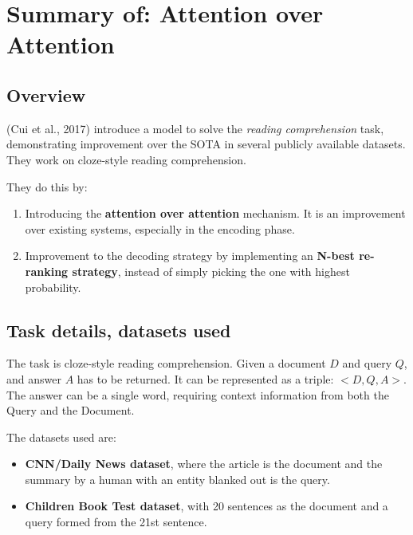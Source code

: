 \documentclass[a4 paper]{article}
\begin{document}

\section{Summary of: Attention over Attention}

\subsection{Overview}

(Cui et al., 2017) introduce a model to solve the \textit{reading comprehension}
task, demonstrating improvement over the SOTA in several publicly available
datasets. They work on cloze-style reading comprehension.

\vspace{1em}

They do this by:
\begin{enumerate}
    \item Introducing the \textbf{attention over attention} mechanism. It is an
        improvement over existing systems, especially in the encoding phase.
    \item Improvement to the decoding strategy by implementing an 
        \textbf{N-best re-ranking strategy}, instead of simply picking the
        one with highest probability.
\end{enumerate}

\subsection{Task details, datasets used}
The task is cloze-style reading comprehension. Given a document $D$ and query
$Q$, and answer $A$ has to be returned. It can be represented as a triple:
$<D, Q, A>$. The answer can be a single word, requiring context information
from both the Query and the Document.

\vspace{1em}

The datasets used are:

\begin{itemize}
    \item \textbf{CNN/Daily News dataset}, where the article is the document
        and the summary by a human with an entity blanked out is the query.
    \item \textbf{Children Book Test dataset}, with 20 sentences as the document
        and a query formed from the 21st sentence.
\end{itemize}
\end{document}
